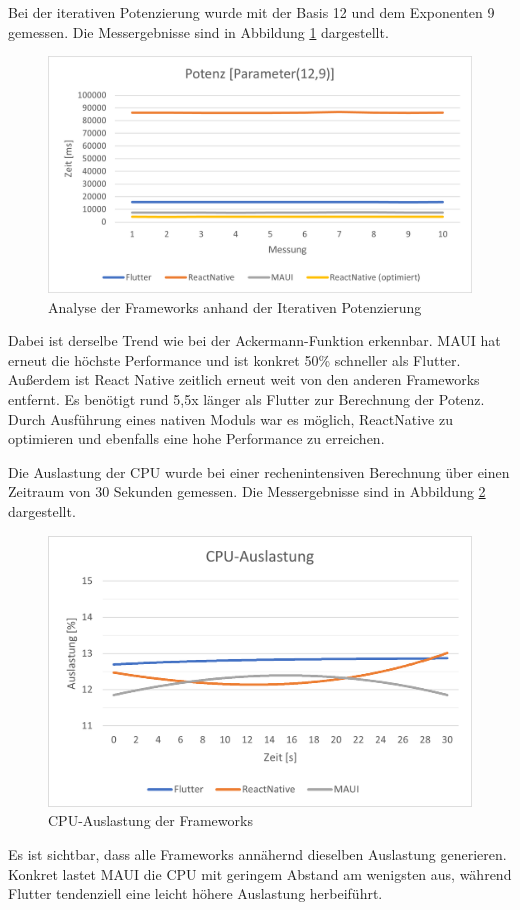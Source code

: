 \documentclass[]{lni}
\begin{document}
Bei der iterativen Potenzierung wurde mit der Basis 12 und dem Exponenten 9 gemessen. Die Messergebnisse sind in Abbildung \ref{fig:potenz} dargestellt.
\begin{figure}[ht]
	\centering
	\includegraphics[width=0.8\linewidth]{images/potenz}
	\caption{Analyse der Frameworks anhand der Iterativen Potenzierung}
	\label{fig:potenz}
\end{figure}
Dabei ist derselbe Trend wie bei der Ackermann-Funktion erkennbar. MAUI hat erneut die höchste Performance und ist konkret 50\% schneller als Flutter. Außerdem ist React Native zeitlich erneut weit von den anderen Frameworks entfernt. Es benötigt rund 5,5x länger als Flutter zur Berechnung der Potenz. Durch Ausführung eines nativen Moduls war es möglich, ReactNative zu optimieren und ebenfalls eine hohe Performance zu erreichen.

Die Auslastung der CPU wurde bei einer rechenintensiven Berechnung über einen Zeitraum von 30 Sekunden gemessen. Die Messergebnisse sind in Abbildung \ref{fig:cpu} dargestellt. 
\begin{figure}[ht]
	\centering
	\includegraphics[width=0.8\linewidth]{images/cpu}
	\caption{CPU-Auslastung der Frameworks}
	\label{fig:cpu}
\end{figure}
Es ist sichtbar, dass alle Frameworks annähernd dieselben Auslastung generieren. Konkret lastet MAUI die CPU mit geringem Abstand am wenigsten aus, während Flutter tendenziell eine leicht höhere Auslastung herbeiführt.
\end{document}
